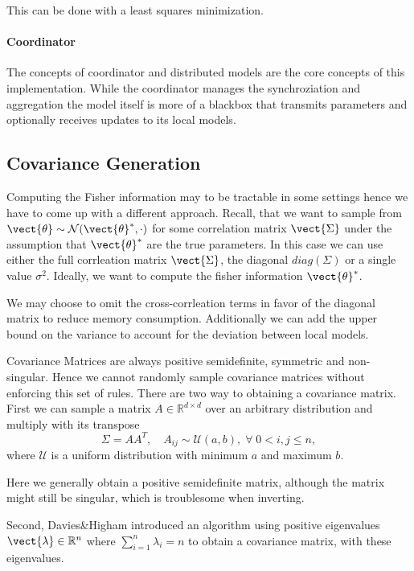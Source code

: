 This can be done with a least squares minimization.


\paragraph*{Coordinator}
The concepts of coordinator and distributed models are the core concepts of this implementation.
While the coordinator manages the synchroziation and aggregation the model itself is more of a blackbox that transmits parameters and optionally receives updates to its local models.

\subsection{Covariance Generation}
Computing the Fisher information may to be tractable in some settings hence we have to come up with a different approach.
Recall, that we want to sample from $\vect{\theta} \sim \mathcal{N}(\vect{\theta}^*, \cdot)$ for some correlation matrix $\vect{\Sigma}$ under the assumption that $\vect{\theta}^*$ are the true parameters.
In this case we can use either the full corrleation matrix $\vect{\Sigma}$, the diagonal $diag(\Sigma)$ or a single value $\sigma^2$.
Ideally, we want to compute the fisher information \wrt $\vect{\theta}^*$.

We may choose to omit the cross-corrleation terms in favor of the diagonal matrix to reduce memory consumption.
Additionally we can add the upper bound on the variance to account for the deviation between local models.

Covariance Matrices are always positive semidefinite, symmetric and non-singular. 
Hence we cannot randomly sample covariance matrices without enforcing this set of rules.
There are two way to obtaining a covariance matrix.
First we can sample a matrix $A\in \mathbb{R}^{d \times d}$ over an arbitrary distribution and multiply with its transpose
\begin{equation}
    \Sigma = AA^T, \quad A_{ij}\sim\mathcal{U}(a,b), \; \forall \;0 < i,j \leq n,
\end{equation}
where $\mathcal{U}$ is a uniform distribution with minimum $a$ and maximum $b$.

Here we generally obtain a positive semidefinite matrix, although the matrix might still be singular, which is troublesome when inverting.

Second, Davies\&Higham \cite{davies2000numerically} introduced an algorithm using positive eigenvalues $\vect{\lambda}\in \mathbb{R}^n$ where $\sum_{i=1}^n \lambda_i = n$ to obtain a covariance matrix, with these eigenvalues.

